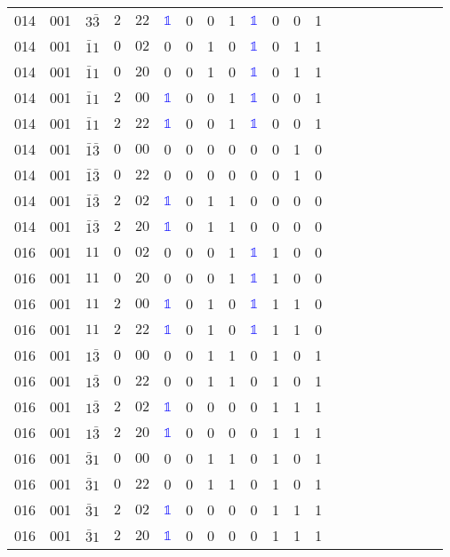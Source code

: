 \begin{longtable*}{c| cccccccccccccccccccc }
014& 001& $3\bar{3}$& $2$& $22$& \textcolor{blue}{$\mathds{1}$}& 0& 0& 1& \textcolor{blue}{$\mathds{1}$}& 0& 0& 1\\
014& 001& $\bar{1}1$& $0$& $02$& 0& 0& 1& 0& \textcolor{blue}{$\mathds{1}$}& 0& 1& 1\\
014& 001& $\bar{1}1$& $0$& $20$& 0& 0& 1& 0& \textcolor{blue}{$\mathds{1}$}& 0& 1& 1\\
014& 001& $\bar{1}1$& $2$& $00$& \textcolor{blue}{$\mathds{1}$}& 0& 0& 1& \textcolor{blue}{$\mathds{1}$}& 0& 0& 1\\
014& 001& $\bar{1}1$& $2$& $22$& \textcolor{blue}{$\mathds{1}$}& 0& 0& 1& \textcolor{blue}{$\mathds{1}$}& 0& 0& 1\\
014& 001& $\bar{1}\bar{3}$& $0$& $00$& 0& 0& 0& 0& 0& 0& 1& 0\\
014& 001& $\bar{1}\bar{3}$& $0$& $22$& 0& 0& 0& 0& 0& 0& 1& 0\\
014& 001& $\bar{1}\bar{3}$& $2$& $02$& \textcolor{blue}{$\mathds{1}$}& 0& 1& 1& 0& 0& 0& 0\\
014& 001& $\bar{1}\bar{3}$& $2$& $20$& \textcolor{blue}{$\mathds{1}$}& 0& 1& 1& 0& 0& 0& 0\\
016& 001& $11$& $0$& $02$& 0& 0& 0& 1& \textcolor{blue}{$\mathds{1}$}& 1& 0& 0\\
016& 001& $11$& $0$& $20$& 0& 0& 0& 1& \textcolor{blue}{$\mathds{1}$}& 1& 0& 0\\
016& 001& $11$& $2$& $00$& \textcolor{blue}{$\mathds{1}$}& 0& 1& 0& \textcolor{blue}{$\mathds{1}$}& 1& 1& 0\\
016& 001& $11$& $2$& $22$& \textcolor{blue}{$\mathds{1}$}& 0& 1& 0& \textcolor{blue}{$\mathds{1}$}& 1& 1& 0\\
016& 001& $1\bar{3}$& $0$& $00$& 0& 0& 1& 1& 0& 1& 0& 1\\
016& 001& $1\bar{3}$& $0$& $22$& 0& 0& 1& 1& 0& 1& 0& 1\\
016& 001& $1\bar{3}$& $2$& $02$& \textcolor{blue}{$\mathds{1}$}& 0& 0& 0& 0& 1& 1& 1\\
016& 001& $1\bar{3}$& $2$& $20$& \textcolor{blue}{$\mathds{1}$}& 0& 0& 0& 0& 1& 1& 1\\
016& 001& $\bar{3}1$& $0$& $00$& 0& 0& 1& 1& 0& 1& 0& 1\\
016& 001& $\bar{3}1$& $0$& $22$& 0& 0& 1& 1& 0& 1& 0& 1\\
016& 001& $\bar{3}1$& $2$& $02$& \textcolor{blue}{$\mathds{1}$}& 0& 0& 0& 0& 1& 1& 1\\
016& 001& $\bar{3}1$& $2$& $20$& \textcolor{blue}{$\mathds{1}$}& 0& 0& 0& 0& 1& 1& 1\\

\end{longtable*}

